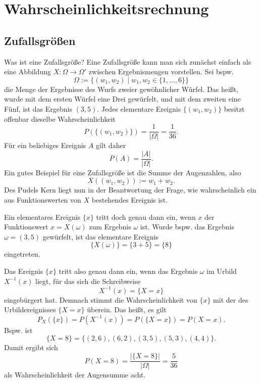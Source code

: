 \documentclass[a4paper,10pt,fleqn,twocolumn,twoside,dvipdfmx]{scrartcl}
\begin{document}
\section{Wahrscheinlichkeitsrechnung}

\subsection{Zufallsgrößen}

Was ist eine Zufallsgröße? Eine Zufallsgröße kann man sich zunächst
einfach als eine Abbildung $X\colon\Omega\to\Omega'$ zwischen
Ergebnismengen vorstellen. Sei bspw.
\[\Omega := \{(w_1,w_2)\mid w_1,w_2\in\{1,\ldots,6\}\}\]
die Menge der Ergebnisse des Wurfs zweier gewöhnlicher
Würfel. Das heißt, wurde mit dem ersten Würfel eine Drei
gewürfelt, und mit dem zweiten eine Fünf, ist das Ergebnis $(3, 5)$.
Jedes elementare Ereignis $\{(w_1,w_2)\}$ besitzt offenbar
dieselbe Wahrscheinlichkeit%
\[P(\{(w_1,w_2)\}) = \frac{1}{|\Omega|} = \frac{1}{36}.\]
Für ein beliebiges Ereignis $A$ gilt daher%
\[P(A) = \frac{|A|}{|\Omega|}.\]
Ein gutes Beispiel für eine Zufallsgröße ist die Summe der
Augenzahlen, also%
\[X((w_1,w_2)) := w_1 + w_2.\]
Des Pudels Kern liegt nun in der Beantwortung der Frage, wie
wahrscheinlich ein aus Funktionswerten von $X$ bestehendes Ereignis
ist.

Ein elementares Ereignis $\{x\}$ tritt doch genau dann ein,
wenn $x$ der Funktionswert $x=X(\omega)$ zum Ergebnis
$\omega$ ist. Wurde bspw. das Ergebnis $\omega=(3, 5)$
gewürfelt, ist das elementare Ereignis%
\[\{X(\omega)\} = \{3 + 5\} = \{8\}\]
eingetreten.

Das Ereignis $\{x\}$ tritt also genau dann ein, wenn das Ergebnis
$\omega$ im Urbild $X^{-1}(x)$ liegt, für das sich die Schreibweise%
\[X^{-1}(x)=\{X=x\}\]
eingebürgert hat. Demnach stimmt die Wahrscheinlichkeit von $\{x\}$
mit der des Urbildereignisses $\{X=x\}$ überein. Das heißt, es gilt%
\[P_X(\{x\}) = P(X^{-1}(x)) = P(\{X=x\}) = P(X=x).\]
Bspw. ist
\[\{X=8\} = \{(2,6), (6,2), (3,5), (5,3), (4,4)\}.\]
Damit ergibt sich
\[P(X=8) = \frac{|\{X=8\}|}{|\Omega|} = \frac{5}{36}\]
als Wahrscheinlichkeit der Augensumme acht.

\end{document}
